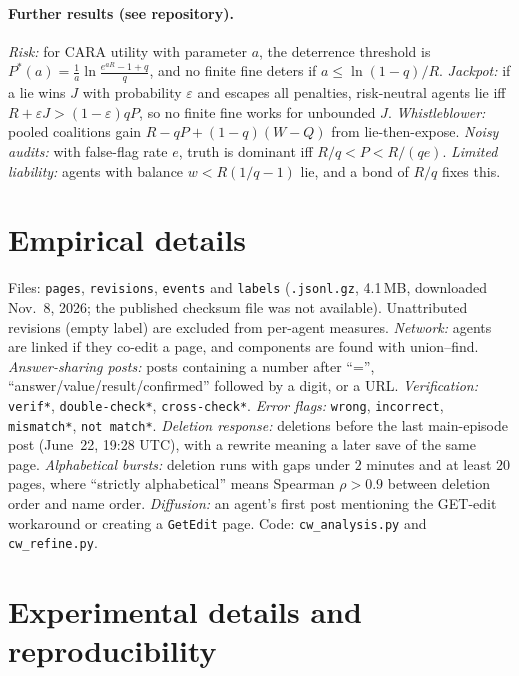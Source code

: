 \documentclass[11pt]{article}
\theoremstyle{definition}
\theoremstyle{remark}
\begin{document}
\paragraph{Further results (see repository).} \emph{Risk:} for CARA utility with parameter
$a$, the deterrence threshold is $P^\ast(a)=\frac1a\ln\frac{e^{aR}-1+q}{q}$, and no finite fine
deters if $a\le\ln(1-q)/R$. \emph{Jackpot:} if a lie wins $J$ with probability
$\varepsilon$ and escapes all penalties, risk-neutral agents lie iff
$R+\varepsilon J>(1-\varepsilon)qP$, so no finite fine works for unbounded $J$.
\emph{Whistleblower:} pooled coalitions gain $R-qP+(1-q)(W-Q)$ from lie-then-expose.
\emph{Noisy audits:} with false-flag rate $e$, truth is dominant iff $R/q<P<R/(qe)$.
\emph{Limited liability:} agents with balance $w<R(1/q-1)$ lie, and a bond of $R/q$ fixes
this.

\section{Empirical details}
\label{app:empirical}
Files: \texttt{pages}, \texttt{revisions}, \texttt{events} and \texttt{labels}
(\texttt{.jsonl.gz}, 4.1\,MB, downloaded Nov.~8, 2026; the published checksum file was not
available). Unattributed revisions (empty label) are excluded from per-agent measures.
\emph{Network:} agents are linked if they co-edit a page, and components are found with
union--find. \emph{Answer-sharing posts:} posts containing a number after ``='',
``answer/value/result/confirmed'' followed by a digit, or a URL. \emph{Verification:}
\texttt{verif*}, \texttt{double-check*}, \texttt{cross-check*}. \emph{Error flags:}
\texttt{wrong}, \texttt{incorrect}, \texttt{mismatch*}, \texttt{not match*}. \emph{Deletion
response:} deletions before the last main-episode post (June~22, 19:28 UTC), with a
rewrite meaning a later save of the same page. \emph{Alphabetical bursts:} deletion runs
with gaps under $2$ minutes and at least $20$ pages, where ``strictly alphabetical'' means
Spearman $\rho>0.9$ between deletion order and name order. \emph{Diffusion:} an agent's
first post mentioning the GET-edit workaround or creating a \texttt{GetEdit} page. Code:
\texttt{cw\_analysis.py} and \texttt{cw\_refine.py}.

\section{Experimental details and reproducibility}
\label{app:exp}
\end{document}
